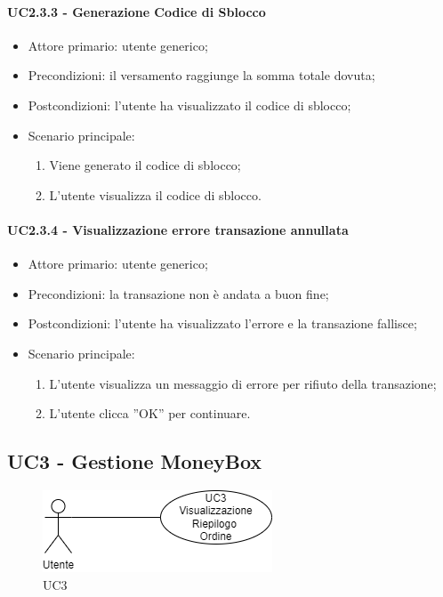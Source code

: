 \paragraph{UC2.3.3 - Generazione Codice di Sblocco}

\begin{itemize}
    \item Attore primario: utente generico;
    \item Precondizioni: il versamento raggiunge la somma totale dovuta;
    \item Postcondizioni: l'utente ha visualizzato il codice di sblocco;
    \item Scenario principale:
          \begin{enumerate}
              \item Viene generato il codice di sblocco;
              \item L'utente visualizza il codice di sblocco.
          \end{enumerate}
\end{itemize}

\paragraph{UC2.3.4 - Visualizzazione errore transazione annullata}

\begin{itemize}
    \item Attore primario: utente generico;
    \item Precondizioni: la transazione non è andata a buon fine;
    \item Postcondizioni: l'utente ha visualizzato l'errore e la transazione fallisce;
    \item Scenario principale:
          \begin{enumerate}
              \item L'utente visualizza un messaggio di errore per rifiuto della transazione;
              \item L'utente clicca ”OK” per continuare.
          \end{enumerate}
\end{itemize}

\subsection{UC3 - Gestione MoneyBox}

\begin{figure}[H]
    \centering
    \includegraphics[scale=0.7]{immagini/UseCases-UC3.png}
    \caption{UC3}
\end{figure}

